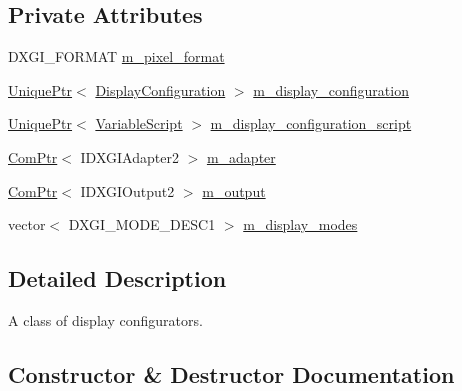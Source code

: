 \subsection*{Private Attributes}
\begin{DoxyCompactItemize}
\item 
D\+X\+G\+I\+\_\+\+F\+O\+R\+M\+AT \hyperlink{classmage_1_1_display_configurator_a22998ef4e54c3da0118a734164792b8f}{m\+\_\+pixel\+\_\+format}
\item 
\hyperlink{namespacemage_a3316d7143a973e37adf1110f2e80ca31}{Unique\+Ptr}$<$ \hyperlink{structmage_1_1_display_configuration}{Display\+Configuration} $>$ \hyperlink{classmage_1_1_display_configurator_a5bccdf0eb57db38cf4e933ecf127488d}{m\+\_\+display\+\_\+configuration}
\item 
\hyperlink{namespacemage_a3316d7143a973e37adf1110f2e80ca31}{Unique\+Ptr}$<$ \hyperlink{classmage_1_1_variable_script}{Variable\+Script} $>$ \hyperlink{classmage_1_1_display_configurator_ab4030a5fe67b8253113799f42a0868c0}{m\+\_\+display\+\_\+configuration\+\_\+script}
\item 
\hyperlink{namespacemage_ae74f374780900893caa5555d1031fd79}{Com\+Ptr}$<$ I\+D\+X\+G\+I\+Adapter2 $>$ \hyperlink{classmage_1_1_display_configurator_a242f05283f449ba77af3d1d97607a00f}{m\+\_\+adapter}
\item 
\hyperlink{namespacemage_ae74f374780900893caa5555d1031fd79}{Com\+Ptr}$<$ I\+D\+X\+G\+I\+Output2 $>$ \hyperlink{classmage_1_1_display_configurator_a181e657b9ce888d3580c9fdbb50898e2}{m\+\_\+output}
\item 
vector$<$ D\+X\+G\+I\+\_\+\+M\+O\+D\+E\+\_\+\+D\+E\+S\+C1 $>$ \hyperlink{classmage_1_1_display_configurator_a714608c9858f92cead47314295f17f96}{m\+\_\+display\+\_\+modes}
\end{DoxyCompactItemize}


\subsection{Detailed Description}
A class of display configurators. 

\subsection{Constructor \& Destructor Documentation}
\hypertarget{classmage_1_1_display_configurator_a88fe13ec0a6902fdc1666a2710a16647}{}\label{classmage_1_1_display_configurator_a88fe13ec0a6902fdc1666a2710a16647} 
